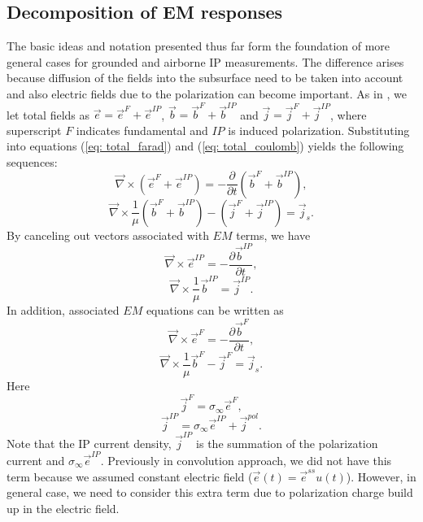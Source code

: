 \documentclass[a4paper, 11pt]{article}
\newcommand{\curl}{{\vec \nabla}\times}
\newcommand{\siginf}{\sigma_\infty}
\renewcommand {\j}  { {\vec j} }
\renewcommand {\b}  { {\vec b} }
\newcommand {\e}  { {\vec e} }
\begin{document}
\subsection{Decomposition of EM responses}
The basic ideas and notation presented thus far form the foundation of more general cases for grounded and airborne IP measurements. The difference arises because diffusion of the fields into the subsurface need to be taken into account and also electric fields due to the polarization can become important. As in \cite{Smith1988a}, we let total fields as $\e = \e^{F} + \e^{IP}$, $\b = \b^{F} + \b^{IP}$ and $\j = \j^{F} + \j^{IP}$, where superscript $F$ indicates fundamental and $IP$ is induced polarization.
Substituting into equations (\ref{eq: total_farad}) and (\ref{eq: total_coulomb}) yields the following sequences:
\begin{equation}
  \curl({\e^{F}+\e^{IP}}) = -\frac{\partial}{\partial t} (\b^{F}+\b^{IP}),
\end{equation}
\begin{equation}
  \curl\frac{1}{\mu}(\b^{F}+\b^{IP}) - (\j^{F}+\j^{IP})= \j_{s}.
\end{equation}
By canceling out vectors associated with $EM$ terms, we have
\begin{equation}
  \curl \e^{IP} = -\frac{\partial \b^{IP}}{\partial t},
  \label{eq: eq_secondary_farad}
\end{equation}
\begin{equation}
  \curl{\frac{1}{\mu}\b^{IP}} = \j^{IP}.
  \label{eq: eq_secondary_coulomb}
\end{equation}
In addition, associated $EM$ equations can be written as
\begin{equation}
  \curl \e^{F} = -\frac{\partial \b^{F}}{\partial t},
  \label{eq: eq_primary_farad}
\end{equation}
\begin{equation}
  \curl{\frac{1}{\mu}\b^{F}} -\j^{F} = \j_s.
  \label{eq: eq_primary_coulomb}
\end{equation}
Here
\begin{equation}
  \j^{F} = \siginf\e^{F},
  \label{eq: jF}
\end{equation}
\begin{equation}
  \j^{IP} = \siginf\e^{IP} + \j^{pol}.
  \label{eq: jIP}
\end{equation}
Note that the IP current density, $\j^{IP}$ is the summation of the polarization current and $\siginf\e^{IP}$. Previously in convolution approach, we did not have this term because we assumed constant electric field ($\e(t) = \e^{ss}u(t)$). However, in general case, we need to consider this extra term due to polarization charge build up in the electric field.
\end{document}
